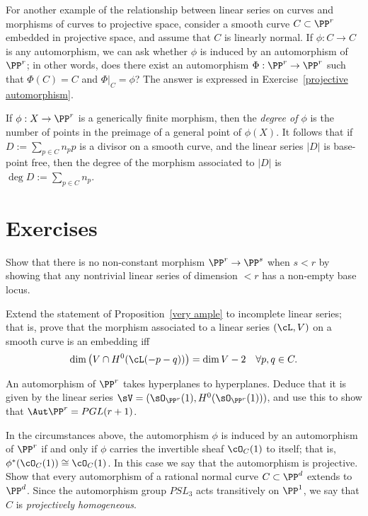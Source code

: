 For another example of the relationship between linear series on curves and morphisms of curves to projective space, consider a smooth curve $C \subset \PP^r$ embedded in projective space, and assume that $C$ is linearly normal. If $\phi : C \to C$ is any automorphism, we can ask whether $\phi$ is induced by an automorphism of $\PP^r$; in other words, does there exist an automorphism $\Phi : \PP^r \to \PP^r$ such that $\Phi(C) = C$ and $\Phi|_C = \phi$? The answer is expressed in Exercise~\ref{projective automorphism}.


If $\phi:X \to \PP^r$ is a generically finite morphism, then the \emph{degree of $\phi$} is the number of points in the preimage of a general point of $\phi(X)$. It follows that if $D := \sum_{p\in C} n_pp$ is a divisor on a smooth curve, and the linear series $|D|$ is base-point free, then the degree of the morphism associated to $|D|$ is $\deg D := \sum_{p\in C} n_p$.

\section{Exercises}

\begin{exercise}\label{here there be basepoints}
 Show that there is no non-constant morphism $\PP^r\to \PP^s$ when $s<r$ by showing that any nontrivial linear
 series of dimension $<r$ has a non-empty base locus.
\end{exercise}

\begin{exercise}
Extend the statement of Proposition~\ref{very ample} to incomplete linear series; that is, prove that the morphism associated to a linear series $(\cL, V)$
on a smooth curve is an embedding iff
$$
\dim\big( V \cap H^0(\cL(-p-q))\big) = \dim V - 2 \quad \forall p, q \in C.
$$
\end{exercise}

\begin{exercise}
An automorphism of $\PP^r$ takes hyperplanes to hyperplanes. Deduce that it is given by the linear series
$\sV = (\sO_{\PP^r}(1), H^0(\sO_{\PP^r}(1)))$, and use this to show that $\Aut \PP^r = PGL(r+1)$. 
\end{exercise}

\begin{exercise}\label{projective automorphism}
In the circumstances above, the automorphism $\phi$ is induced by an automorphism of $\PP^r$ if and only if $\phi$ carries the invertible sheaf $\cO_{C}(1)$ to itself; that is, $\phi^*(\cO_{C}(1)) \cong \cO_{C}(1)$. In this case we say that the automorphism
is projective. Show that every automorphism of a rational normal curve $C \subset \PP^d$  extends to $\PP^d$. Since the
automorphism group $PSL_3$ acts transitively on $\PP^1$, we say that
$C$ is \emph{projectively homogeneous}.


\end{exercise}

